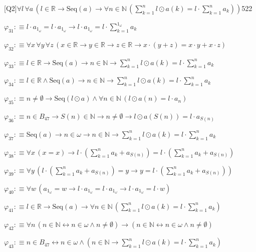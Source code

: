 \begin{fullproof}{[Q2]}{$\forall l\,\forall a\,(l \in \mathbb{R} \to \mathrm{Seq}(a) \to \forall n \in \mathbb{N}\,({\textstyle\sum_{k=1}^{n} l \odot a(k)} = l \cdot {\textstyle\sum_{k=1}^{n} a_{k}}))$}{522}
\begin{abbrevlist}
\item $\varphi_{31} :\equiv l \cdot a_{1_{\omega}} = l \cdot a_{1_{\omega}} \to l \cdot a_{1_{\omega}} = l \cdot {\textstyle\sum_{k=1}^{1_{\omega}} a_{k}}$
\item $\varphi_{32} :\equiv \forall x\,\forall y\,\forall z\,(x \in \mathbb{R} \to y \in \mathbb{R} \to z \in \mathbb{R} \to x \cdot (y + z) = x \cdot y + x \cdot z)$
\item $\varphi_{33} :\equiv l \in \mathbb{R} \to \mathrm{Seq}(a) \to n \in \mathbb{N} \to {\textstyle\sum_{k=1}^{n} l \odot a(k)} = l \cdot {\textstyle\sum_{k=1}^{n} a_{k}}$
\item $\varphi_{34} :\equiv l \in \mathbb{R} \land \mathrm{Seq}(a) \to n \in \mathbb{N} \to {\textstyle\sum_{k=1}^{n} l \odot a(k)} = l \cdot {\textstyle\sum_{k=1}^{n} a_{k}}$
\item $\varphi_{35} :\equiv n \neq \emptyset \to \mathrm{Seq}(l \odot a) \land \forall n \in \mathbb{N}\,(l \odot a(n) = l \cdot a_{n})$
\item $\varphi_{36} :\equiv n \in B_{47} \to S(n) \in \mathbb{N} \to n \neq \emptyset \to l \odot a(S(n)) = l \cdot a_{S(n)}$
\item $\varphi_{37} :\equiv \mathrm{Seq}(a) \to n \in \omega \to n \in \mathbb{N} \to {\textstyle\sum_{k=1}^{n} l \odot a(k)} = l \cdot {\textstyle\sum_{k=1}^{n} a_{k}}$
\item $\varphi_{38} :\equiv \forall x\,(x = x) \to l \cdot ({\textstyle\sum_{k=1}^{n} a_{k}} + a_{S(n)}) = l \cdot ({\textstyle\sum_{k=1}^{n} a_{k}} + a_{S(n)})$
\item $\varphi_{39} :\equiv \forall y\,(l \cdot ({\textstyle\sum_{k=1}^{n} a_{k}} + a_{S(n)}) = y \to y = l \cdot ({\textstyle\sum_{k=1}^{n} a_{k}} + a_{S(n)}))$
\item $\varphi_{40} :\equiv \forall w\,(a_{1_{\omega}} = w \to l \cdot a_{1_{\omega}} = l \cdot a_{1_{\omega}} \to l \cdot a_{1_{\omega}} = l \cdot w)$
\item $\varphi_{41} :\equiv l \in \mathbb{R} \to \mathrm{Seq}(a) \to \forall n \in \mathbb{N}\,({\textstyle\sum_{k=1}^{n} l \odot a(k)} = l \cdot {\textstyle\sum_{k=1}^{n} a_{k}})$
\item $\varphi_{42} :\equiv \forall n\,(n \in \mathbb{N} \leftrightarrow n \in \omega \land n \neq \emptyset) \to (n \in \mathbb{N} \leftrightarrow n \in \omega \land n \neq \emptyset)$
\item $\varphi_{43} :\equiv n \in B_{47} \leftrightarrow n \in \omega \land (n \in \mathbb{N} \to {\textstyle\sum_{k=1}^{n} l \odot a(k)} = l \cdot {\textstyle\sum_{k=1}^{n} a_{k}})$

\end{abbrevlist}
\end{fullproof}
